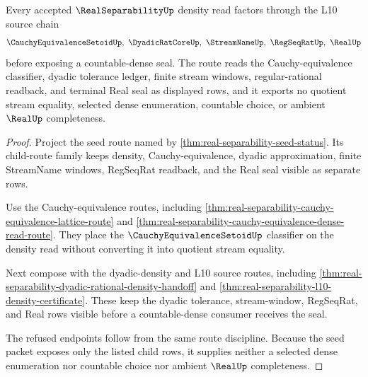 \begin{theorem}
\label{thm:real-separability-scoped-density-route}
Every accepted $\RealSeparabilityUp$ density read factors through the L10 source chain
$$
\CauchyEquivalenceSetoidUp,\ \DyadicRatCoreUp,\ \StreamNameUp,\ \RegSeqRatUp,\ \RealUp
$$
before exposing a countable-dense seal. The route reads the Cauchy-equivalence classifier, dyadic tolerance ledger, finite stream windows, regular-rational readback, and terminal Real seal as displayed rows, and it exports no quotient stream equality, selected dense enumeration, countable choice, or ambient $\RealUp$ completeness.
\end{theorem}
\begin{proof}
Project the seed route named by \autoref{thm:real-separability-seed-status}. Its child-route family keeps density, Cauchy-equivalence, dyadic approximation, finite StreamName windows, RegSeqRat readback, and the Real seal visible as separate rows.

Use the Cauchy-equivalence routes, including \autoref{thm:real-separability-cauchy-equivalence-lattice-route} and \autoref{thm:real-separability-cauchy-equivalence-dense-read-route}. They place the $\CauchyEquivalenceSetoidUp$ classifier on the density read without converting it into quotient stream equality.

Next compose with the dyadic-density and L10 source routes, including \autoref{thm:real-separability-dyadic-rational-density-handoff} and \autoref{thm:real-separability-l10-density-certificate}. These keep the dyadic tolerance, stream-window, RegSeqRat, and Real rows visible before a countable-dense consumer receives the seal.

The refused endpoints follow from the same route discipline. Because the seed packet exposes only the listed child rows, it supplies neither a selected dense enumeration nor countable choice nor ambient $\RealUp$ completeness.
\end{proof}

